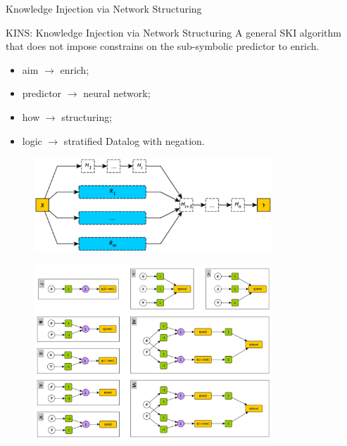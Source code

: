 \documentclass[presentation]{beamer}\mode<presentation>{\usetheme{AMSBolognaFC}}
\begin{document}
\begin{frame}[allowframebreaks]{Knowledge Injection via Network Structuring}
    
    \begin{block}{KINS: Knowledge Injection via Network Structuring}
        A general SKI algorithm that does not impose constrains on the sub-symbolic predictor to enrich.
        \begin{itemize}
            \item aim $\rightarrow$ enrich;
            \item predictor $\rightarrow$ neural network;
            \item how $\rightarrow$ structuring;
            \item logic $\rightarrow$ stratified Datalog with negation.
        \end{itemize}        
    \end{block}
    
    \framebreak
    
    \begin{figure}
        \centering
        \includegraphics[width=0.8\textwidth]{figures/kins-architecture}
    \end{figure}
    
    \framebreak
    
    
    
    \framebreak
    
    \begin{figure}
        \centering
        \includegraphics[width=0.8\textwidth]{figures/kins-fuzzifier-modules}
    \end{figure}
    
\end{frame}
\end{document}
